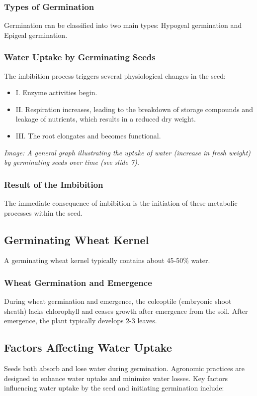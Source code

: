 \subsubsection*{Types of Germination} 
Germination can be classified into two main types: Hypogeal germination and Epigeal germination.

\subsubsection*{Water Uptake by Germinating Seeds} 
The imbibition process triggers several physiological changes in the seed: 

\begin{itemize} 
    \item I. Enzyme activities begin. 
    \item II. Respiration increases, leading to the breakdown of storage compounds and leakage of nutrients, which results in a reduced dry weight. 
    \item III. The root elongates and becomes functional. 
\end{itemize} 

\textit{Image: A general graph illustrating the uptake of water (increase in fresh weight) by germinating seeds over time (see slide 7).}

\subsubsection*{Result of the Imbibition} 
The immediate consequence of imbibition is the initiation of these metabolic processes within the seed.

\subsection{Germinating Wheat Kernel} 
A germinating wheat kernel typically contains about 45-50\% water.

\subsubsection*{Wheat Germination and Emergence} 
During wheat germination and emergence, the coleoptile (embryonic shoot sheath) lacks chlorophyll and ceases growth after emergence from the soil. After emergence, the plant typically develops 2-3 leaves.

\subsection{Factors Affecting Water Uptake} 
Seeds both absorb and lose water during germination. Agronomic practices are designed to enhance water uptake and minimize water losses. Key factors influencing water uptake by the seed and initiating germination include: 


